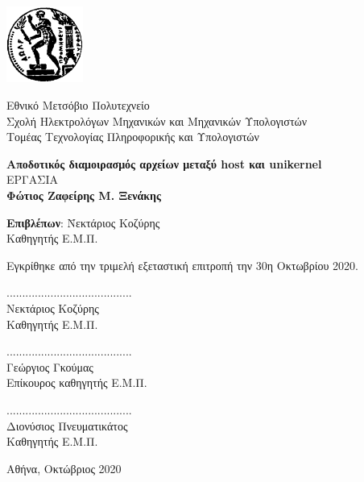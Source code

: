 \documentclass[12pt, a4paper, notitlepage]{report}
\newcommand{\en}[1]{\foreignlanguage{english}{#1}}
\newcommand{\blankpage}{\newpage\null\thispagestyle{empty}\newpage}
\newcommand{\host}{\en{host}}
\begin{document}
\blankpage

\vspace*{-8ex}
\noindent
\begin{minipage}{3.0cm}
	\includegraphics[height=2.5cm]{pyrforos}
\end{minipage}
\begin{minipage}{12.0cm}
	Εθνικό Μετσόβιο Πολυτεχνείο \\[3pt]
	Σχολή Ηλεκτρολόγων Μηχανικών και Μηχανικών Υπολογιστών \\[3pt]
	Τομέας Τεχνολογίας Πληροφορικής και Υπολογιστών
\end{minipage}
\vspace{14ex}
\begin{center}
	\large\textbf{Αποδοτικός διαμοιρασμός αρχείων μεταξύ \host{} και \en{unikernel}} \\
	\vspace{14ex}
	 ΕΡΓΑΣΙΑ \\
	\vspace{1ex}
	\center\textbf{Φώτιος Ζαφείρης Μ. Ξενάκης}
\end{center}
\vfill
\begin{tabbing}
	\normalsize
	\textbf{Επιβλέπων}: \= Νεκτάριος Κοζύρης \\
						\> Καθηγητής Ε.Μ.Π.
\end{tabbing}
\vspace{4ex}
Εγκρίθηκε από την τριμελή εξεταστική επιτροπή την 30η Οκτωβρίου 2020.
\vspace{4ex}
\begin{center}
	\scriptsize
	\parbox[b]{0.3\textwidth} {
		\center
		........................................ \\
		Νεκτάριος Κοζύρης \\
		Καθηγητής Ε.Μ.Π.
	}
	\parbox[b]{0.3\textwidth} {
		\center
		........................................ \\
		Γεώργιος Γκούμας \\
		Επίκουρος καθηγητής Ε.Μ.Π.
	}
	\parbox[b]{0.3\textwidth} {
		\center
		........................................ \\
		Διονύσιος Πνευματικάτος \\
		Καθηγητής Ε.Μ.Π.
	}
\end{center}
\vspace{2ex}
\begin{center}
	\normalsize
	Αθήνα, Οκτώβριος 2020
\end{center}
\thispagestyle{empty}
\end{document}
